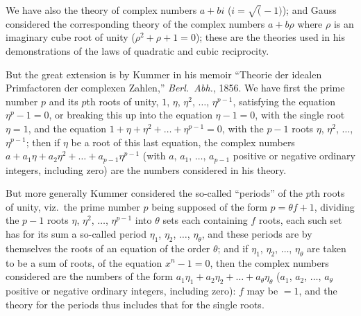 \documentclass[12pt,a4paper,oneside]{book}
\begin{document}
We have also the theory of complex numbers $a+bi$ ($i=\surd(-1)$); and Gauss considered the corresponding theory of the complex numbers $a+b\rho$ where $\rho$ is an imaginary cube root of unity ($\rho^{2}+\rho+1=0$); these are the theories used in his demonstrations of the laws of quadratic and cubic reciprocity.

\newpage
But the great extension is by Kummer in his memoir ``Theorie der idealen Primfactoren der complexen Zahlen,'' \textit{Berl.\ Abh.}, 1856. We have first the prime number $p$ and its $p$th roots of unity, $1$, $\eta$, $\eta^{2}$, $\dots$, $\eta^{p-1}$, satisfying the equation $\eta^{p}-1=0$, or breaking this up into the equation $\eta-1=0$, with the single root $\eta=1$, and the equation $1+\eta+\eta^{2}+\dots+\eta^{p-1}=0$, with the $p-1$ roots $\eta$, $\eta^{2}$, $\dots$, $\eta^{p-1}$; then if $\eta$ be a root of this last equation, the complex numbers $a+a_{1}\eta+a_{2}\eta^{2}+\dots+a_{p-1}\eta^{p-1}$ (with $a$, $a_{1}$, $\dots$, $a_{p-1}$ positive or negative ordinary integers, including zero) are the numbers considered in his theory.

But more generally Kummer considered the so-called ``periods'' of the $p$th roots of unity, viz.\ the prime number $p$ being supposed of the form $p=\theta f+1$, dividing the $p-1$ roots $\eta$, $\eta^{2}$, $\dots$, $\eta^{p-1}$ into $\theta$ sets each containing $f$ roots, each such set has for its sum a so-called period $\eta_{1}$, $\eta_{2}$, $\dots$, $\eta_{\theta}$, and these periods are by themselves the roots of an equation of the order $\theta$; and if $\eta_{1}$, $\eta_{2}$, $\dots$, $\eta_{\theta}$ are taken to be a sum of roots, of the equation $x^{n}-1=0$, then the complex numbers considered are the numbers of the form $a_{1}\eta_{1}+a_{2}\eta_{2}+\dots+a_{\theta}\eta_{\theta}$ ($a_{1}$, $a_{2}$, $\dots$, $a_{\theta}$ positive or negative ordinary integers, including zero): $f$ may be $=1$, and the theory for the periods thus includes that for the single roots.
\end{document}
